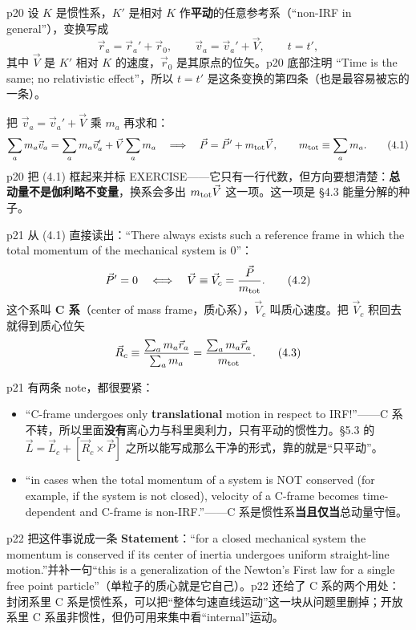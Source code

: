 \documentclass[11pt]{ctexart}
\begin{document}


p20 设 $K$ 是惯性系，$K'$ 是相对 $K$ 作\textbf{平动}的任意参考系（“non-IRF in general”），变换写成
\[
\vec r_a=\vec r_a'+\vec r_0,\qquad \vec v_a=\vec v_a'+\vec V,\qquad t=t',
\]
其中 $\vec V$ 是 $K'$ 相对 $K$ 的速度，$\vec r_0$ 是其原点的位矢。p20 底部注明 “Time is the same; no relativistic effect”，所以 $t=t'$ 是这条变换的第四条（也是最容易被忘的一条）。

把 $\vec v_a=\vec v_a'+\vec V$ 乘 $m_a$ 再求和：
\[
\sum_am_a\vec v_a=\sum_am_a\vec v_a'+\vec V\sum_am_a
\quad\Longrightarrow\quad
\vec P=\vec P'+m_{\rm tot}\vec V,\qquad m_{\rm tot}\equiv\sum_am_a . \tag{4.1}
\]
p20 把 (4.1) 框起来并标 EXERCISE——它只有一行代数，但方向要想清楚：\textbf{总动量不是伽利略不变量}，换系会多出 $m_{\rm tot}\vec V$ 这一项。这一项是 §4.3 能量分解的种子。


p21 从 (4.1) 直接读出：“There always exists such a reference frame in which the total momentum of the mechanical system is 0”：
\[
\vec P'=0\quad\Longleftrightarrow\quad \vec V\equiv\vec V_c=\frac{\vec P}{m_{\rm tot}} . \tag{4.2}
\]
这个系叫 \textbf{C 系}（center of mass frame，质心系），$\vec V_c$ 叫质心速度。把 $\vec V_c$ 积回去就得到质心位矢
\[
\vec R_c\equiv\frac{\sum_am_a\vec r_a}{\sum_am_a}=\frac{\sum_am_a\vec r_a}{m_{\rm tot}} . \tag{4.3}
\]

p21 有两条 note，都很要紧：
\begin{itemize}
\item “C-frame undergoes only \textbf{translational} motion in respect to IRF!”——C 系不转，所以里面\textbf{没有}离心力与科里奥利力，只有平动的惯性力。§5.3 的 $\vec L=\vec L_c+[\vec R_c\times\vec P]$ 之所以能写成那么干净的形式，靠的就是“只平动”。
\item “in cases when the total momentum of a system is NOT conserved (for example, if the system is not closed), velocity of a C-frame becomes time-dependent and C-frame is non-IRF.”——C 系是惯性系\textbf{当且仅当}总动量守恒。
\end{itemize}

p22 把这件事说成一条 \textbf{Statement}：“for a closed mechanical system the momentum is conserved if its center of inertia undergoes uniform straight-line motion.”并补一句“this is a generalization of the Newton's First law for a single free point particle”（单粒子的质心就是它自己）。p22 还给了 C 系的两个用处：封闭系里 C 系是惯性系，可以把“整体匀速直线运动”这一块从问题里删掉；开放系里 C 系虽非惯性，但仍可用来集中看“internal”运动。
\end{document}
